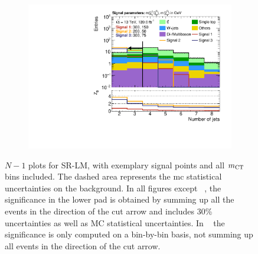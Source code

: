 \begin{figure}
	\begin{subfigure}[b]{0.45\linewidth}
		\centering\includegraphics[width=\textwidth]{n1_SRLM_mct_bins/nJet30.pdf}
		\vspace{-2em}
		\caption{\label{fig:Wh_reopt_second_round_n1_srlm_njet}}
	\end{subfigure}
	\caption{$N-1$ plots for SR-LM, with exemplary signal points and all $m_{\textrm{CT}}$ bins included. The dashed area represents the \gls{mc} statistical uncertainties on the background. In all figures except \figname~, the significance in the lower pad is obtained by summing up all the events in the direction of the cut arrow and includes 30\% uncertainties as well as MC statistical uncertainties. In \figname~ the significance is only computed on a bin-by-bin basis, \ie not summing up all events in the direction of the cut arrow.}
	\label{fig:Wh_reopt_second_round_n1_srlm}
\end{figure}

